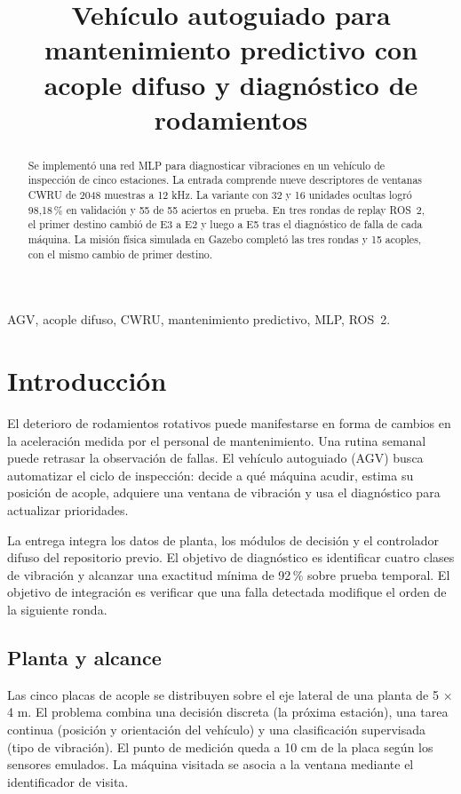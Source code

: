 \documentclass[conference,letterpaper]{IEEEtran}
\title{Vehículo autoguiado para mantenimiento predictivo con acople difuso y diagnóstico de rodamientos}
\author{\IEEEauthorblockN{Integrantes \underline{\hspace{5cm}}}
\IEEEauthorblockA{Ingeniería Mecatrónica, Universidad ECOTEC\\MEC451 Autómatas y Expertos · U3S7}}
\begin{document}
\maketitle
\begin{abstract}
Se implementó una red MLP para diagnosticar vibraciones en un vehículo de inspección de cinco estaciones. La entrada comprende nueve descriptores de ventanas CWRU de 2048 muestras a 12 kHz. La variante con 32 y 16 unidades ocultas logró 98,18\,\% en validación y 55 de 55 aciertos en prueba. En tres rondas de replay ROS~2, el primer destino cambió de E3 a E2 y luego a E5 tras el diagnóstico de falla de cada máquina. La misión física simulada en Gazebo completó las tres rondas y 15 acoples, con el mismo cambio de primer destino.
\end{abstract}
\begin{IEEEkeywords}
AGV, acople difuso, CWRU, mantenimiento predictivo, MLP, ROS~2.
\end{IEEEkeywords}
\section{Introducción}
El deterioro de rodamientos rotativos puede manifestarse en forma de cambios en la aceleración medida por el personal de mantenimiento. Una rutina semanal puede retrasar la observación de fallas. El vehículo autoguiado (AGV) busca automatizar el ciclo de inspección: decide a qué máquina acudir, estima su posición de acople, adquiere una ventana de vibración y usa el diagnóstico para actualizar prioridades.

La entrega integra los datos de planta, los módulos de decisión y el controlador difuso del repositorio previo. El objetivo de diagnóstico es identificar cuatro clases de vibración y alcanzar una exactitud mínima de 92\,\% sobre prueba temporal. El objetivo de integración es verificar que una falla detectada modifique el orden de la siguiente ronda.
\newpage
\subsection{Planta y alcance}
Las cinco placas de acople se distribuyen sobre el eje lateral de una planta de 5 × 4 m. El problema combina una decisión discreta (la próxima estación), una tarea continua (posición y orientación del vehículo) y una clasificación supervisada (tipo de vibración). El punto de medición queda a 10 cm de la placa según los sensores emulados. La máquina visitada se asocia a la ventana mediante el identificador de visita.
\end{document}
